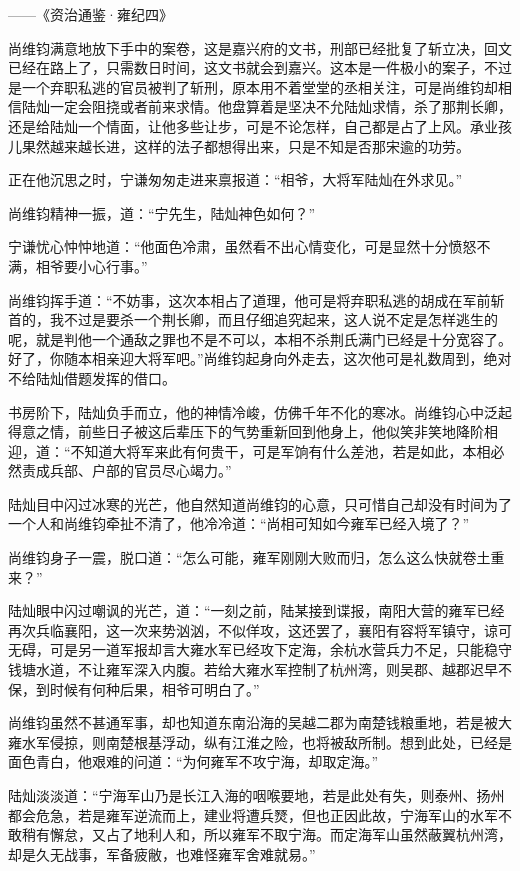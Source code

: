 ——《资治通鉴·雍纪四》

尚维钧满意地放下手中的案卷，这是嘉兴府的文书，刑部已经批复了斩立决，回文已经在路上了，只需数日时间，这文书就会到嘉兴。这本是一件极小的案子，不过是一个弃职私逃的官员被判了斩刑，原本用不着堂堂的丞相关注，可是尚维钧却相信陆灿一定会阻挠或者前来求情。他盘算着是坚决不允陆灿求情，杀了那荆长卿，还是给陆灿一个情面，让他多些让步，可是不论怎样，自己都是占了上风。承业孩儿果然越来越长进，这样的法子都想得出来，只是不知是否那宋逾的功劳。

正在他沉思之时，宁谦匆匆走进来禀报道：“相爷，大将军陆灿在外求见。”

尚维钧精神一振，道：“宁先生，陆灿神色如何？”

宁谦忧心忡忡地道：“他面色冷肃，虽然看不出心情变化，可是显然十分愤怒不满，相爷要小心行事。”

尚维钧挥手道：“不妨事，这次本相占了道理，他可是将弃职私逃的胡成在军前斩首的，我不过是要杀一个荆长卿，而且仔细追究起来，这人说不定是怎样逃生的呢，就是判他一个通敌之罪也不是不可以，本相不杀荆氏满门已经是十分宽容了。好了，你随本相亲迎大将军吧。”尚维钧起身向外走去，这次他可是礼数周到，绝对不给陆灿借题发挥的借口。

书房阶下，陆灿负手而立，他的神情冷峻，仿佛千年不化的寒冰。尚维钧心中泛起得意之情，前些日子被这后辈压下的气势重新回到他身上，他似笑非笑地降阶相迎，道：“不知道大将军来此有何贵干，可是军饷有什么差池，若是如此，本相必然责成兵部、户部的官员尽心竭力。”

陆灿目中闪过冰寒的光芒，他自然知道尚维钧的心意，只可惜自己却没有时间为了一个人和尚维钧牵扯不清了，他冷冷道：“尚相可知如今雍军已经入境了？”

尚维钧身子一震，脱口道：“怎么可能，雍军刚刚大败而归，怎么这么快就卷土重来？”

陆灿眼中闪过嘲讽的光芒，道：“一刻之前，陆某接到谍报，南阳大营的雍军已经再次兵临襄阳，这一次来势汹汹，不似佯攻，这还罢了，襄阳有容将军镇守，谅可无碍，可是另一道军报却言大雍水军已经攻下定海，余杭水营兵力不足，只能稳守钱塘水道，不让雍军深入内腹。若给大雍水军控制了杭州湾，则吴郡、越郡迟早不保，到时候有何种后果，相爷可明白了。”

尚维钧虽然不甚通军事，却也知道东南沿海的吴越二郡为南楚钱粮重地，若是被大雍水军侵掠，则南楚根基浮动，纵有江淮之险，也将被敌所制。想到此处，已经是面色青白，他艰难的问道：“为何雍军不攻宁海，却取定海。”

陆灿淡淡道：“宁海军山乃是长江入海的咽喉要地，若是此处有失，则泰州、扬州都会危急，若是雍军逆流而上，建业将遭兵燹，但也正因此故，宁海军山的水军不敢稍有懈怠，又占了地利人和，所以雍军不取宁海。而定海军山虽然蔽翼杭州湾，却是久无战事，军备疲敝，也难怪雍军舍难就易。”

